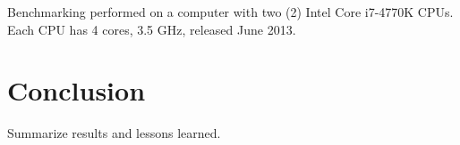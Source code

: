 \begin{table}[t]
  \centering
  \small
  \caption{Benchmarking performed on a computer with two (2) Intel Core i7-4770K CPUs. Each CPU has 4 cores, 3.5 GHz, released June 2013.}%
  
  \label{tab:results}%
\end{table}%


\section{Conclusion}
Summarize results and lessons learned.






